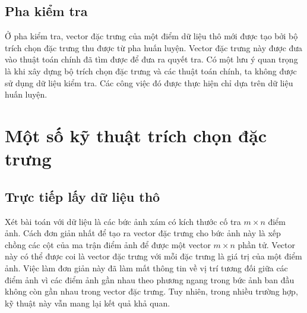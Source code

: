  
\subsection{Pha kiểm tra}

Ở pha kiểm tra, vector đặc trưng của một điểm dữ liệu thô mới được tạo bởi bộ trích chọn đặc trưng thu được từ pha huấn luyện. Vector đặc trưng này được đưa
vào thuật toán chính đã tìm được để đưa ra quyết tra. Có một lưu ý quan trọng là khi xây dựng bộ trích chọn đặc trưng và các thuật toán chính, ta không được sử dụng dữ liệu kiểm tra. Các công việc đó được thực hiện chỉ dựa trên dữ liệu huấn luyện. 

 
 
\section{Một số kỹ thuật trích chọn đặc trưng}
 
\subsection{Trực tiếp lấy dữ liệu thô}

Xét bài toán với dữ liệu là các bức ảnh xám có kích thước cố tra $m\times n$
điểm ảnh. Cách đơn giản nhất để tạo ra vector đặc trưng cho bức ảnh này là xếp
chồng các cột của ma trận điểm ảnh để được một vector $m\times n$ phần tử.
Vector này có thể được coi là vector đặc trưng với mỗi đặc trưng là giá trị của
một điểm ảnh. Việc làm đơn giản này đã làm mất {thông tin về vị trí tương đối}
giữa các điểm ảnh vì các điểm ảnh gần nhau theo phương ngang trong bức ảnh ban
đầu không còn gần nhau trong vector đặc trưng. Tuy nhiên, trong
nhiều trường hợp, kỹ thuật này vẫn mang lại kết quả khả quan.
 
